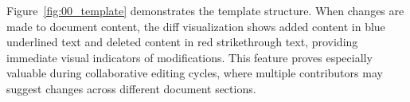 Figure~\ref{fig:00_template} demonstrates the template structure. When changes are made to document content, the diff visualization shows added content in blue underlined text and deleted content in red strikethrough text, providing immediate visual indicators of modifications. This feature proves especially valuable during collaborative editing cycles, where multiple contributors may suggest changes across different document sections.

